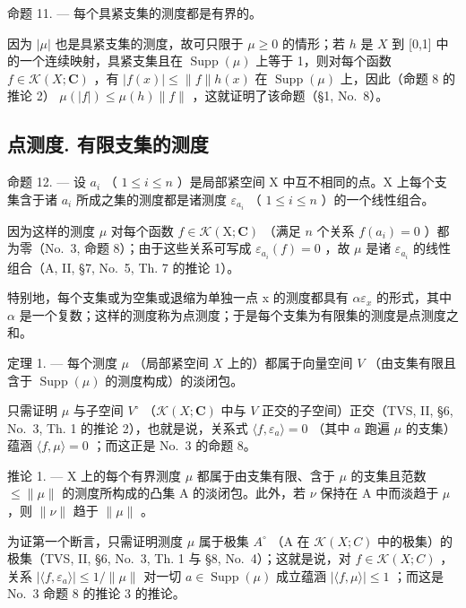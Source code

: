 命题 11. --- 每个具紧支集的测度都是有界的。

因为 \(|\mu|\) 也是具紧支集的测度，故可只限于 \(\mu \geqslant 0\) 的情形；若 \(h\) 是 \(X\) 到 {[}0,1{]} 中的一个连续映射，具紧支集且在 \(\operatorname{Supp}(\mu)\) 上等于 1，则对每个函数 \(f \in \mathcal{K}(X; \mathbf{C})\) ，有 \(|f(x)| \leqslant \|f\|h(x)\) 在 \(\operatorname{Supp}(\mu)\) 上，因此（命题 8 的推论 2） \(\mu(|f|) \leqslant \mu(h)\|f\|\) ，这就证明了该命题（§1, No.~8）。

\subsection{点测度. 有限支集的测度}

命题 12. --- 设 \(a_i\) （ \(1 \leqslant i \leqslant n\) ）是局部紧空间 X 中互不相同的点。X 上每个支集含于诸 \(a_i\) 所成之集的测度都是诸测度 \(\varepsilon_{a_i}\) （ \(1 \leqslant i \leqslant n\) ）的一个线性组合。

因为这样的测度 \(\mu\) 对每个函数 \(f\in\mathcal{K}(\mathrm{X};\mathbf{C})\) （满足 \(n\) 个关系 \(f(a_{i})=0\) ）都为零（No.~3, 命题 8）；由于这些关系可写成 \(\varepsilon_{a_{i}}(f)=0\) ，故 \(\mu\) 是诸 \(\varepsilon_{a_{i}}\) 的线性组合（A, II, §7, No.~5, Th. 7 的推论 1）。

特别地，每个支集或为空集或退缩为单独一点 x 的测度都具有 \(\alpha\varepsilon_{x}\) 的形式，其中 \(\alpha\) 是一个复数；这样的测度称为点测度；于是每个支集为有限集的测度是点测度之和。

定理 1. --- 每个测度 \(\mu\) （局部紧空间 \(X\) 上的）都属于向量空间 \(V\) （由支集有限且含于 \(\operatorname{Supp}(\mu)\) 的测度构成）的淡闭包。

只需证明 \(\mu\) 与子空间 \(V^{\circ}\) （\(\mathcal{K}(X; \mathbf{C})\) 中与 \(V\) 正交的子空间）正交（TVS, II, §6, No.~3, Th. 1 的推论 2），也就是说，关系式 \(\langle f, \varepsilon_{a} \rangle = 0\) （其中 \(a\) 跑遍 \(\mu\) 的支集）蕴涵 \(\langle f, \mu \rangle = 0\) ；而这正是 No.~3 的命题 8。

推论 1. --- X 上的每个有界测度 \(\mu\) 都属于由支集有限、含于 \(\mu\) 的支集且范数 \(\leqslant \| \mu \|\) 的测度所构成的凸集 A 的淡闭包。此外，若 \(\nu\) 保持在 A 中而淡趋于 \(\mu\) ，则 \(\| \nu \|\) 趋于 \(\| \mu \|\) 。

为证第一个断言，只需证明测度 \(\mu\) 属于极集 \(A^{\circ}\) （A 在 \(\mathcal{K}(X;C)\) 中的极集）的极集（TVS, II, §6, No.~3, Th. 1 与 §8, No.~4）；这就是说，对 \(f \in \mathcal{K}(X;C)\) ，关系 \(|\langle f,\varepsilon_{a}\rangle| \leqslant 1/\|\mu\|\) 对一切 \(a \in \operatorname{Supp}(\mu)\) 成立蕴涵 \(|\langle f,\mu\rangle| \leqslant 1\) ；而这是 No.~3 命题 8 的推论 3 的推论。

